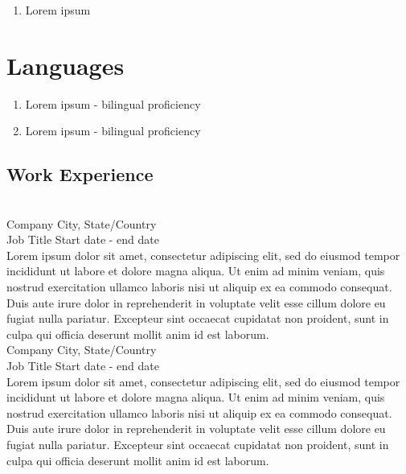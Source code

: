 \documentclass{resume_template}
\begin{document}
\begin{tcbraster}[raster columns=6,raster height=11in,raster column skip=0in,raster row skip=0in,raster force size=false]
\begin{tcolorbox}[colframe=secondary,colback=secondary,arc=0mm,add to width=-3in,height=8.75in,raster multicolumn=2]
\begin{enumerate}[\indent {}]
				\item Lorem ipsum \\[0.05in]
				
			\end{enumerate}
		\section*{Languages}
			\vspace*{-0.2in}
			\hrulefill
			\begin{enumerate}[\indent {}]
				\item Lorem ipsum - bilingual proficiency
				\item Lorem ipsum - bilingual proficiency
			\end{enumerate}
	\end{tcolorbox}
	\begin{tcolorbox}[colframe=white,colback=white,arc=0mm,add to width=1.25in,height=8.75in,raster multicolumn=4]
		\section*{Work Experience}
			\vspace*{-0.2in}
			\hrulefill\\
			
			Company \hfill City, State/Country \\
			Job Title \hfill Start date - end date \\
			Lorem ipsum dolor sit amet, consectetur adipiscing elit, sed do eiusmod tempor incididunt ut labore et dolore magna aliqua. Ut enim ad minim veniam, quis nostrud exercitation ullamco laboris nisi ut aliquip ex ea commodo consequat. Duis aute irure dolor in reprehenderit in voluptate velit esse cillum dolore eu fugiat nulla pariatur. Excepteur sint occaecat cupidatat non proident, sunt in culpa qui officia deserunt mollit anim id est laborum.\\
			
			Company \hfill City, State/Country \\
			Job Title \hfill Start date - end date \\
			Lorem ipsum dolor sit amet, consectetur adipiscing elit, sed do eiusmod tempor incididunt ut labore et dolore magna aliqua. Ut enim ad minim veniam, quis nostrud exercitation ullamco laboris nisi ut aliquip ex ea commodo consequat. Duis aute irure dolor in reprehenderit in voluptate velit esse cillum dolore eu fugiat nulla pariatur. Excepteur sint occaecat cupidatat non proident, sunt in culpa qui officia deserunt mollit anim id est laborum.			
			

\end{tcolorbox}
\end{tcbraster}
\end{document}
